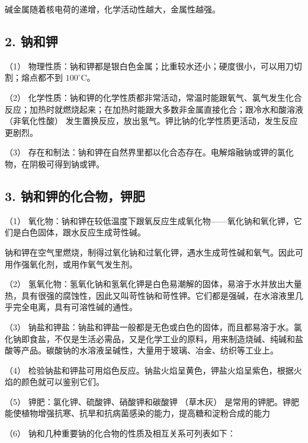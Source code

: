 碱金属随着核电荷的递增，化学活动性越大，金属性越强。

\subsection{2. 钠和钾}

（1）
物理性质：钠和钾都是银白色金属；比重较水还小；硬度很小，可以用刀切割；熔点都不到
\(100^{\circ} \mathrm{C}\)。

（2）
化学性质：钠和钾的化学性质都非常活动，常温时能跟氧气、氯气发生化合反应；加热时就燃烧起来；在加热时能跟大多数非金属直接化合；跟冷水和酸溶液
（非氧化性酸）
发生置换反应，放出氢气。钾比钠的化学性质更活动，发生反应更剧烈。

（3）
存在和制法：钠和钾在自然界里都以化合态存在。电解熔融钠或钾的氯化物，在阴极可得到钠或钾。

\subsection{3. 钠和钾的化合物，钾肥}

（1）
氧化物：钠和钾在较低温度下跟氧反应生成氧化物------氧化钠和氧化钾，它们是白色固体，跟水反应生成苛性碱。

钠和钾在空气里燃烧，制得过氧化钠和过氧化钾，遇水生成苛性碱和氧气。因此可用作强氧化剂，或用作氧气发生剂。

（2）
氢氧化物：氢氧化钠和氢氧化钾是白色易潮解的固体，易溶于水并放出大量热，具有很强的腐蚀性，因此又叫苛性钠和苛性钾。它们都是强碱，在水溶液里几乎完全电离，具有可溶性碱的通性。

（3）
钠盐和钾盐：钠盐和钾盐一般都是无色或白色的固体，而且都易溶于水。氯化钠即食盐，不仅是生活必需品，又是化学工业的原料，用来制造烧碱、纯碱和盐酸等产品。碳酸钠的水溶液呈碱性，大量用于玻璃、冶金、纺织等工业上。

（4）
检验钠盐和钾盐可用焰色反应。钠盐火焰呈黄色，钾盐火焰呈紫色，根据火焰的颜色就可以鉴别它们。

（5） 钾肥：氯化钾、硫酸钾、硝酸钾和碳酸钾 （草木灰）
是常用的钾肥。钾肥能使植物增强抗寒、抗旱和抗病菌感染的能力，提高糖和淀粉合成的能力

（6） 钠和几种重要钠的化合物的性质及相互关系可列表如下：

